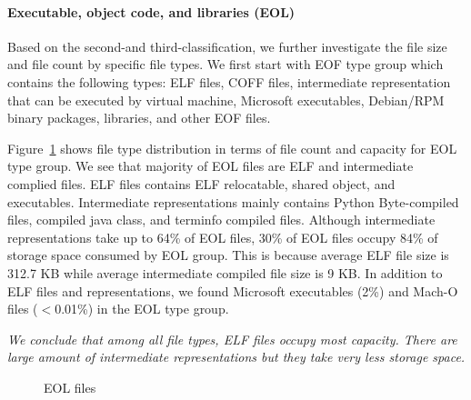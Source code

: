 
\paragraph{Executable, object code, and libraries (EOL)}
Based on the second-and third-classification, we further investigate the file size and file count by specific file types. We first start with EOF type group which contains the following types: ELF files, COFF files, intermediate representation that can be executed by virtual machine, Microsoft executables, Debian/RPM binary packages, libraries, and other EOF files.

Figure~\ref{fig:type-eof} shows file type distribution in terms of file count and capacity for EOL type group. 
We see that majority of EOL files are ELF and intermediate complied files. ELF files contains ELF relocatable, shared object, and executables. Intermediate representations mainly contains Python Byte-compiled files, compiled java class, and terminfo compiled files. Although intermediate representations take up to 64\% of EOL files, 30\% of EOL files occupy 84\% of storage space consumed by EOL group. 
This is because average ELF file size is 312.7 KB while average intermediate compiled file size is 9 KB. In addition to ELF files and representations, we found Microsoft executables (2\%) and Mach-O files ($<$0.01\%) in the EOL type group.

\textit{We conclude that among all file types, ELF files occupy most capacity. There are large amount of intermediate representations but they take very less storage space.}

\begin{figure}
	\centering
	\caption{EOL files}
	\label{fig:type-eof}
\end{figure}

